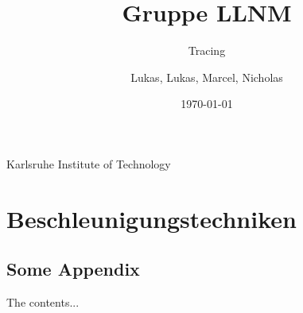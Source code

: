 \documentclass[11pt,a4paper,titlepage]{scrartcl}
\newcommand{\university}{Karlsruhe Institute of Technology}
\begin{document}

\title{Gruppe LLNM}
\subtitle{Tracing}
\author{Lukas, Lukas, Marcel, Nicholas}
\date{\today}

\graphicspath{{./images/}}

\makeatletter
\begin{titlepage}
	\centering
	{\LARGE \university \par}
	\vspace{5cm}
	{\LARGE \@title\par}
	\vspace{0.1cm}
	{\normalfont \@subtitle\par}
	\vspace{3cm}
	{\LARGE \@author\par}
	\vfill
	{\LARGE \@date\par}
\end{titlepage}
\makeatother
{}
\sffamily\tableofcontents
\clearpage
{}



\section{Beschleunigungstechniken}








\clearpage %
%



\clearpage
\begin{appendices}
\section{Some Appendix} %
The contents...
\end{appendices}
\end{document}
